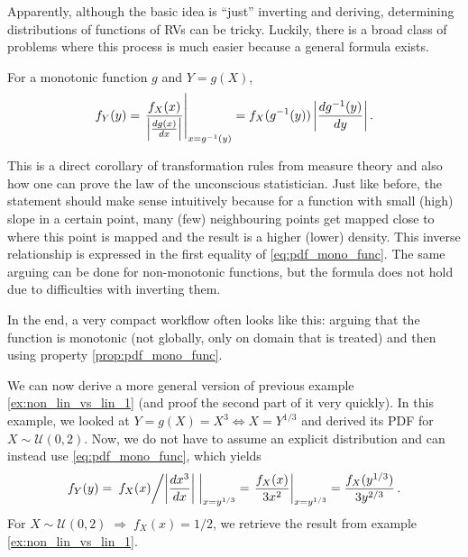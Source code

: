 Apparently, although the basic idea is \enquote{just} inverting and deriving, determining distributions of functions of RVs can be tricky. Luckily, there is a broad class of problems where this process is much easier because a general formula exists.
\begin{prop}\label{prop:pdf_mono_func}
For a monotonic function $g$ and $Y = g(X)$,
\begin{equation}\label{eq:pdf_mono_func}
f_Y(y) = \eval{\frac{f_X(x)}{\abs{\dv{g(x)}{x}}}}_{x = g^{-1}(y)} = f_X(g^{-1}(y)) \, \abs{\dv{g^{-1}(y)}{y}} \, .
\end{equation}
\end{prop}
This is a direct corollary of transformation rules from measure theory and also how one can prove the law of the unconscious statistician. Just like before, the statement should make sense intuitively because for a function with small (high) slope in a certain point, many (few) neighbouring points get mapped close to where this point is mapped and the result is a higher (lower) density. This inverse relationship is expressed in the first equality of \eqref{eq:pdf_mono_func}. The same arguing can be done for non-monotonic functions, but the formula does not hold due to difficulties with inverting them.

In the end, a very compact workflow often looks like this: arguing that the function is monotonic (not globally, only on domain that is treated) and then using property \ref{prop:pdf_mono_func}.\\



\begin{ex}
We can now derive a more general version of previous example \ref{ex:non_lin_vs_lin_1} (and proof the second part of it very quickly). In this example, we looked at $Y = g(X) = X^3 \Leftrightarrow X = Y^{1 / 3}$ and derived its PDF for $X \sim \mathcal{U}(0, 2)$. Now, we do not have to assume an explicit distribution and can instead use \eqref{eq:pdf_mono_func}, which yields
\begin{equation*}
f_Y(y) = \eval{\flatfrac{f_X(x)}{\abs{\dv{x^3}{x}}}}_{x = y^{1 / 3}} = \eval{\frac{f_X(x)}{3 x^2}}_{x = y^{1 / 3}} = \frac{f_X(y^{1 / 3})}{3 y^{2 / 3}} \, .
\end{equation*}
For $X \sim \mathcal{U}(0, 2) \; \Rightarrow \; f_X(x) = 1 / 2$, we retrieve the result from example \ref{ex:non_lin_vs_lin_1}.
\end{ex}



